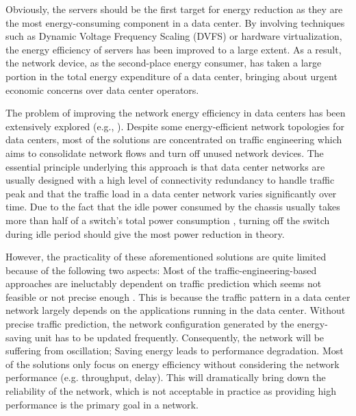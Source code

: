 \documentclass[10pt, conference, compsocconf]{IEEEtran}
\begin{document}
Obviously, the servers should be the first target for energy reduction as they are the most energy-consuming component in a data center.   
By involving techniques such as Dynamic Voltage Frequency Scaling (DVFS) or hardware virtualization, the energy efficiency of servers has been improved to a large extent. As a result, the network device, as the second-place energy consumer, has taken a large portion in the total energy expenditure of a data center, bringing about urgent economic concerns over data center operators.



The problem of improving the network energy efficiency in data centers has been extensively explored (e.g., \cite{Heller_Seetharaman, Shang_Li, Wang_Yao,  Vasic_Bhurat-2011, Wang_Zhang-JSAC-2013}). Despite some energy-efficient network topologies for data centers, most of the solutions are concentrated on traffic engineering which aims to consolidate network flows and turn off unused network devices. The essential principle underlying this approach is that data center networks are usually designed with a high level of connectivity redundancy to handle traffic peak and that the traffic load in a data center network varies significantly over time. Due to the fact that the idle power consumed by the chassis usually takes more than half of a switch's total power consumption \cite{Mahadevan_Sharma}, turning off the switch during idle period should give the most power reduction in theory.

However, the practicality of these aforementioned solutions are quite limited because of the following two aspects:  Most of the traffic-engineering-based approaches are ineluctably dependent on traffic prediction which seems not feasible or not precise enough \cite{Benson_Anand}. This is because the traffic pattern in a data center network largely depends on the applications running in the data center. Without precise traffic prediction, the network configuration generated by the energy-saving unit has to be updated frequently. Consequently, the network will be suffering from oscillation;  Saving energy leads to performance degradation. Most of the solutions only focus on energy efficiency without considering the network performance (e.g. throughput, delay). This will dramatically bring down the reliability of the network, which is not acceptable in practice as providing high performance is the primary goal in a network.
\end{document}
